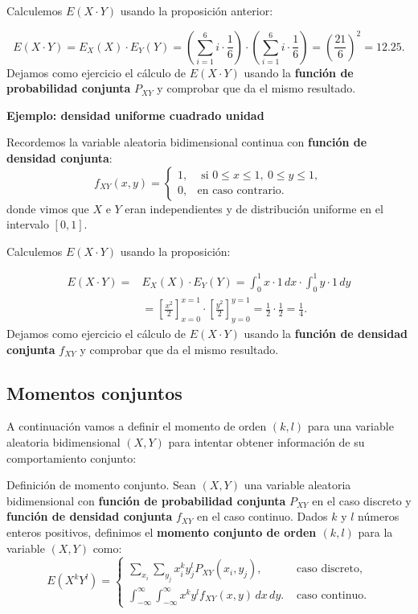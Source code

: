 \documentclass[
  letterpaper,
  DIV=11,
  numbers=noendperiod]{scrreprt}
\begin{document}
Calculemos \(E(X\cdot Y)\) usando la proposición anterior:

\[
E(X\cdot Y)=\displaystyle E_X(X)\cdot E_Y(Y)=\left(\sum_{i=1}^6 i\cdot \frac{1}{6}\right)\cdot \left(\sum_{i=1}^6 i\cdot \frac{1}{6}\right)=\left(\frac{21}{6}\right)^2 = 12.25.
\] Dejamos como ejercicio el cálculo de \(E(X\cdot Y)\) usando la
\textbf{función de probabilidad conjunta} \(P_{XY}\) y comprobar que da
el mismo resultado.

\textbf{Ejemplo: densidad uniforme cuadrado unidad}

Recordemos la variable aleatoria bidimensional continua con
\textbf{función de densidad conjunta}: \[
f_{XY}(x,y)=\displaystyle \begin{cases}
1, & \mbox{ si }0\leq x\leq 1,\ 0\leq y\leq 1, \\
0, & \mbox{en caso contrario.}
\end{cases}
\] donde vimos que \(X\) e \(Y\) eran independientes y de distribución
uniforme en el intervalo \([0,1]\).

Calculemos \(E(X\cdot Y)\) usando la proposición:

\[
\begin{array}{rl}
E(X\cdot Y)= & \displaystyle E_X(X)\cdot E_Y(Y)=\int_0^1 x\cdot 1\, dx\cdot \int_0^1 y\cdot 1\, dy\\
& =\left[\frac{x^2}{2}\right]_{x=0}^{x=1}\cdot \left[\frac{y^2}{2}\right]_{y=0}^{y=1}=\frac{1}{2}\cdot \frac{1}{2}=\frac{1}{4}.
\end{array}
\] Dejamos como ejercicio el cálculo de \(E(X\cdot Y)\) usando la
\textbf{función de densidad conjunta} \(f_{XY}\) y comprobar que da el
mismo resultado.

\hypertarget{momentos-conjuntos}{%
\subsection{Momentos conjuntos}\label{momentos-conjuntos}}

A continuación vamos a definir el momento de orden \((k,l)\) para una
variable aleatoria bidimensional \((X,Y)\) para intentar obtener
información de su comportamiento conjunto:

Definición de momento conjunto. Sean \((X,Y)\) una variable aleatoria
bidimensional con \textbf{función de probabilidad conjunta} \(P_{XY}\)
en el caso discreto y \textbf{función de densidad conjunta} \(f_{XY}\)
en el caso continuo. Dados \(k\) y \(l\) números enteros positivos,
definimos el \textbf{momento conjunto de orden \((k,l)\)} para la
variable \((X,Y)\) como: \[
E\left(X^k Y^l\right)=\begin{cases}
\displaystyle \sum_{x_i}\sum_{y_j} x_i^k y_j^l P_{XY}(x_i,y_j), & \mbox{ caso discreto,} \\\displaystyle
\int_{-\infty}^\infty\int_{-\infty}^\infty x^k y^l f_{XY}(x,y)\, dx\, dy. & \mbox{ caso continuo.}
\end{cases}
\]
\end{document}
